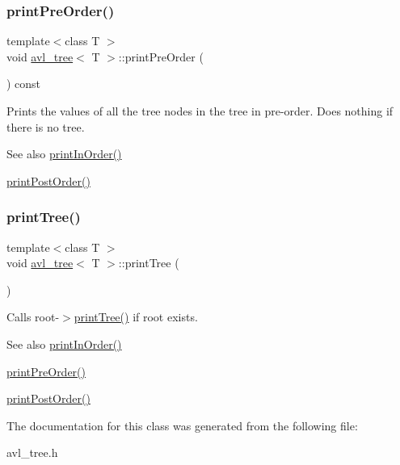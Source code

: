 \subsubsection{\texorpdfstring{print\+Pre\+Order()}{printPreOrder()}}
{\footnotesize\ttfamily template$<$class T $>$ \\
void \hyperlink{classavl__tree}{avl\+\_\+tree}$<$ T $>$\+::print\+Pre\+Order (\begin{DoxyParamCaption}{ }\end{DoxyParamCaption}) const\hspace{0.3cm}{\ttfamily [inline]}}

Prints the values of all the tree nodes in the tree in pre-\/order. Does nothing if there is no tree. \begin{DoxySeeAlso}{See also}
\hyperlink{classavl__tree_a524ae6ac5d7f7c2399fb758aba84af80}{print\+In\+Order()} 

\hyperlink{classavl__tree_a5fb83061648947aeb6b540a5dee7ae13}{print\+Post\+Order()} 
\end{DoxySeeAlso}
\mbox{\label{classavl__tree_ae067ad48ed35e1df18fdda1ed83c3d79}} 
\subsubsection{\texorpdfstring{print\+Tree()}{printTree()}}
{\footnotesize\ttfamily template$<$class T $>$ \\
void \hyperlink{classavl__tree}{avl\+\_\+tree}$<$ T $>$\+::print\+Tree (\begin{DoxyParamCaption}{ }\end{DoxyParamCaption})\hspace{0.3cm}{\ttfamily [inline]}}

Calls root-\/$>$\hyperlink{classavl__tree_ae067ad48ed35e1df18fdda1ed83c3d79}{print\+Tree()} if root exists. \begin{DoxySeeAlso}{See also}
\hyperlink{classavl__tree_a524ae6ac5d7f7c2399fb758aba84af80}{print\+In\+Order()} 

\hyperlink{classavl__tree_ac17fa1e4aa2f0f4b609a7b72c34bd2f6}{print\+Pre\+Order()} 

\hyperlink{classavl__tree_a5fb83061648947aeb6b540a5dee7ae13}{print\+Post\+Order()} 
\end{DoxySeeAlso}


The documentation for this class was generated from the following file\+:\begin{DoxyCompactItemize}
\item 
avl\+\_\+tree.\+h\end{DoxyCompactItemize}
